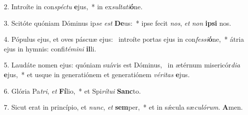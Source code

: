 2. Introíte in con\textit{spéc}\textit{tu} \textbf{e}jus,~*  in ex\textit{sul}\textit{ta}\textit{ti}\textbf{ó}ne.\

3. Scitóte quóniam Dóminus ip\textit{se} \textit{est} \textbf{De}us:~*  ipse fecit \textit{nos}, \textit{et} \textit{non} \textbf{ip}\textbf{si} nos.\

4. Pópulus ejus, et oves páscuæ ejus: \dag\  introíte portas ejus in con\textit{fes}\textit{si}\textbf{ó}ne,~*  átria ejus in hymnis: confi\textit{té}\textit{mi}\textit{ni} \textbf{il}li.\

5. Laudáte nomen ejus: quóniam suávis est Dóminus, \dag\  in ætérnum misericór\textit{di}\textit{a} \textbf{e}jus,~*  et usque in generatiónem et generatiónem \textit{vé}\textit{ri}\textit{tas} \textbf{e}jus.\

6. Glória Pa\textit{tri}, \textit{et} \textbf{Fí}lio,~*  et Spi\textit{rí}\textit{tu}\textit{i} \textbf{Sanc}to.\

7. Sicut erat in princípio, et \textit{nunc}, \textit{et} \textbf{sem}per,~*  et in sǽcula sæ\textit{cu}\textit{ló}\textit{rum}. \textbf{A}men.\

